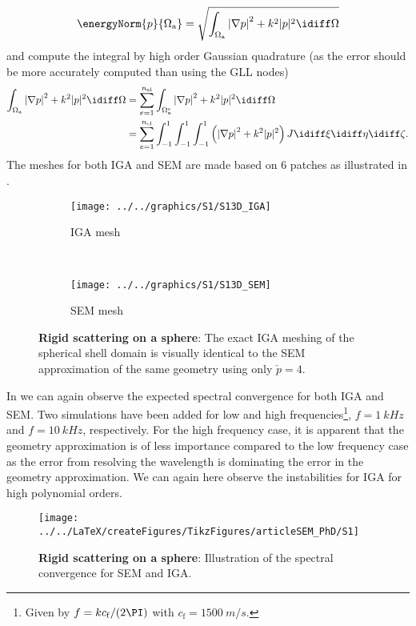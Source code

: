 \begin{equation}\label{Eq5:energyNormFluids}
	\energyNorm{p}{\Omega_{\mathrm{a}}} = \sqrt{\int_{\Omega_{\mathrm{a}}} \left|\nabla p\right|^2 + k^2|p|^2 \idiff\Omega}
\end{equation}
and compute the integral by high order Gaussian quadrature (as the error should be more accurately computed than using the GLL nodes)
\begin{align*}
	\int_{\Omega_{\mathrm{a}}} \left|\nabla p\right|^2 + k^2|p|^2 \idiff\Omega &= \sum_{e=1}^{n_{\mathrm{el}}} \int_{\Omega_{\mathrm{a}}^e} \left|\nabla p\right|^2 + k^2|p|^2 \idiff\Omega\\
	&= \sum_{e=1}^{n_{\mathrm{el}}} \int_{-1}^1\int_{-1}^1\int_{-1}^1 \left(\left|\nabla p\right|^2 + k^2|p|^2\right)J \idiff\xi\idiff\eta\idiff\zeta.
\end{align*}
The meshes for both IGA and SEM are made based on 6 patches as illustrated in .
\begin{figure}
	\centering
	\begin{subfigure}[t]{0.4\textwidth}
		\centering
		\texttt{[image: ../../graphics/S1/S13D\_IGA]}
		\caption{IGA mesh}
	\end{subfigure}
	~    
	\begin{subfigure}[t]{0.4\textwidth}
		\centering
		\texttt{[image: ../../graphics/S1/S13D\_SEM]}
		\caption{SEM mesh}
	\end{subfigure}
	\caption{\textbf{Rigid scattering on a sphere}: The exact IGA meshing of the spherical shell domain is visually identical to the SEM approximation of the same geometry using only $\check{p}=4$.}
	\label{Fig5:mesh}
\end{figure}
In  we can again observe the expected spectral convergence for both IGA and SEM. Two simulations have been added for low and high frequencies\footnote{Given by $f=kc_{\mathrm{f}}/(2\PI)$ with $c_{\mathrm{f}}=\SI{1500}{m/s}$.}, $f=\SI{1}{kHz}$ and $f=\SI{10}{kHz}$, respectively. For the high frequency case, it is apparent that the geometry approximation is of less importance compared to the low frequency case as the error from resolving the wavelength is dominating the error in the geometry approximation. We can again here observe the instabilities for IGA for high polynomial orders.
\begin{figure}
	\centering
	\texttt{[image: ../../LaTeX/createFigures/TikzFigures/articleSEM\_PhD/S1]}
	\caption{\textbf{Rigid scattering on a sphere}: Illustration of the spectral convergence for SEM and IGA.}
	\label{Fig5:S1}
\end{figure}
